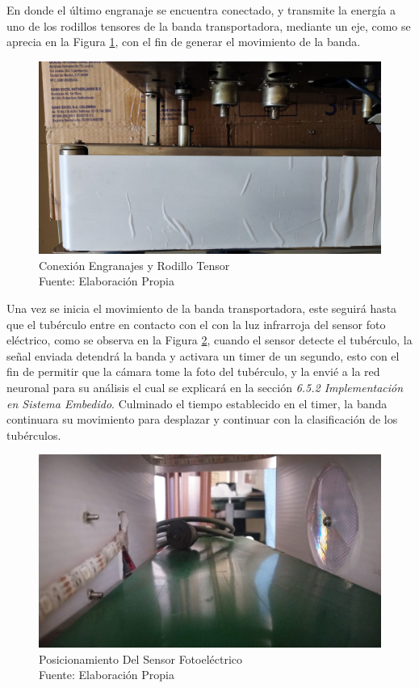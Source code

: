 En donde el último engranaje se encuentra conectado, y transmite la energía a uno de los rodillos tensores de la banda transportadora, mediante un eje, como se aprecia en la Figura \ref{fig:eje}, con el fin de generar el movimiento de la banda. 

\newpage
\begin{figure}[ht]
	\centering
	\includegraphics[angle=270, scale=0.3]{Figs/202.jpg}
	\caption{Conexión Engranajes y Rodillo Tensor\\Fuente: Elaboración Propia}
	\label{fig:eje}
\end{figure}


Una vez se inicia el movimiento de la banda transportadora, este seguirá hasta que el tubérculo entre en contacto con el con la luz infrarroja del sensor foto eléctrico, como se observa en la Figura \ref{fig:sensor}, cuando el sensor detecte el tubérculo, la señal enviada detendrá la banda y activara un timer de un segundo, esto con el fin de permitir que la cámara tome la foto del tubérculo, y la envié a la red neuronal para su análisis el cual se explicará en la sección \textit{6.5.2 Implementación en Sistema Embedido}. Culminado el tiempo establecido en el timer, la banda continuara su movimiento para desplazar y continuar con la clasificación de los tubérculos.

\begin{figure}[ht]
	\centering
	\includegraphics[scale=0.2]{Figs/203.jpg}
	\caption{Posicionamiento Del Sensor Fotoeléctrico\\Fuente: Elaboración Propia}
	\label{fig:sensor}
\end{figure}

